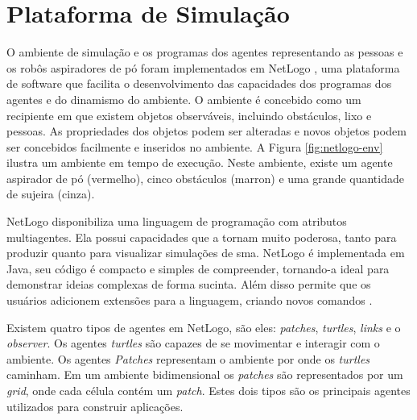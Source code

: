 \section{Plataforma de Simulação}
\label{sec:plat-sim}

O ambiente de simulação e os programas dos agentes representando as pessoas e os robôs aspiradores de pó foram implementados em NetLogo \cite{wilensky1999netlogo}, uma plataforma de software que facilita o desenvolvimento das capacidades dos programas dos agentes e do dinamismo do ambiente. O ambiente é concebido como um recipiente em que existem objetos observáveis, incluindo obstáculos, lixo e pessoas. As propriedades dos objetos podem ser alteradas e novos objetos podem ser concebidos facilmente e inseridos no ambiente. A Figura \ref{fig:netlogo-env} ilustra um ambiente em tempo de execução. Neste ambiente, existe um agente aspirador de pó (vermelho), cinco obstáculos (marron) e uma grande quantidade de sujeira (cinza).


\begin{figure}[h!]
    \centering
\end{figure}

NetLogo disponibiliza uma linguagem de programação com atributos multiagentes. Ela possui capacidades que a tornam muito poderosa, tanto para produzir quanto para visualizar simulações de \acrlong{sma}. NetLogo é implementada em Java, seu código é compacto e simples de compreender, tornando-a ideal para demonstrar ideias complexas de forma sucinta. Além disso permite que os usuários adicionem extensões para a linguagem, criando novos comandos \cite{teahan2010artificial}.

Existem quatro tipos de agentes em NetLogo, são eles: \textit{patches}, \textit{turtles}, \textit{links} e o \textit{observer}. Os agentes \textit{turtles} são capazes de se movimentar e interagir com o ambiente. Os agentes \textit{Patches} representam o ambiente por onde os \textit{turtles} caminham. Em um ambiente bidimensional os \textit{patches} são representados por um \textit{grid}, onde cada célula contém um \textit{patch}. Estes dois tipos são os principais agentes utilizados para construir aplicações. 

